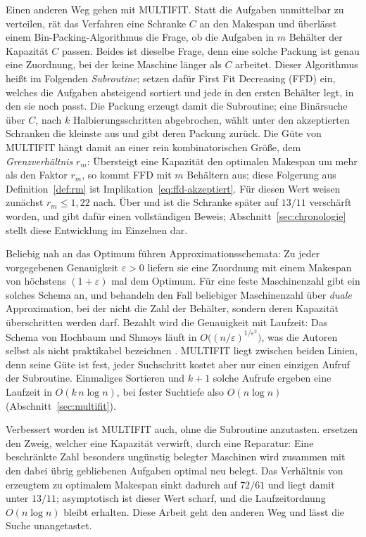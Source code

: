 Einen anderen Weg gehen \textcite{coffman1978} mit MULTIFIT.
Statt die Aufgaben unmittelbar zu verteilen, rät das Verfahren eine Schranke $C$ an den Makespan
und überlässt einem Bin-Packing-Algorithmus die Frage, ob die Aufgaben in $m$ Behälter der
Kapazität $C$ passen.
Beides ist dieselbe Frage, denn eine solche Packung ist genau eine Zuordnung, bei der keine
Maschine länger als $C$ arbeitet.
Dieser Algorithmus heißt im Folgenden \emph{Subroutine}; \textcite{coffman1978} setzen dafür
First Fit Decreasing (FFD) ein, welches die Aufgaben absteigend sortiert und jede in den ersten
Behälter legt, in den sie noch passt.
Die Packung erzeugt damit die Subroutine; eine Binärsuche über $C$, nach $k$
Halbierungsschritten abgebrochen, wählt unter den akzeptierten Schranken die kleinste aus und
gibt deren Packung zurück.
Die Güte von MULTIFIT hängt damit an einer rein kombinatorischen Größe, dem
\emph{Grenzverhältnis} $r_m$: Übersteigt eine Kapazität den optimalen Makespan um mehr als den
Faktor $r_m$, so kommt FFD mit $m$ Behältern aus; diese Folgerung aus
Definition~\ref{def:rm} ist Implikation~\eqref{eq:ffd-akzeptiert}.
Für diesen Wert weisen \textcite{coffman1978} zunächst $r_m \le 1{,}22$ nach.
Über \textcite{friesen1984} und \textcite{yue1990} ist die Schranke später auf $13/11$ verschärft
worden, und \textcite{cao1995} gibt dafür einen vollständigen Beweis;
Abschnitt~\ref{sec:chronologie} stellt diese Entwicklung im Einzelnen dar.

Beliebig nah an das Optimum führen Approximationsschemata: Zu jeder vorgegebenen Genauigkeit
$\varepsilon > 0$ liefern sie eine Zuordnung mit einem Makespan von höchstens $(1+\varepsilon)$
mal dem Optimum.
Für eine feste Maschinenzahl gibt \textcite{sahni1976} ein solches Schema an, und
\textcite{hochbaum_shmoys_1987} behandeln den Fall beliebiger Maschinenzahl über \emph{duale}
Approximation, bei der nicht die Zahl der Behälter, sondern deren Kapazität überschritten werden
darf.
Bezahlt wird die Genauigkeit mit Laufzeit: Das Schema von Hochbaum und Shmoys läuft in
$O\bigl((n/\varepsilon)^{1/\varepsilon^{2}}\bigr)$, was die Autoren selbst als nicht praktikabel
bezeichnen \cite[S.~146]{hochbaum_shmoys_1987}.
MULTIFIT liegt zwischen beiden Linien, denn seine Güte ist fest, jeder Suchschritt kostet aber
nur einen einzigen Aufruf der Subroutine.
Einmaliges Sortieren und $k+1$ solche Aufrufe ergeben eine Laufzeit in $O(k\,n \log n)$, bei
fester Suchtiefe also $O(n \log n)$ (Abschnitt~\ref{sec:multifit}).

Verbessert worden ist MULTIFIT auch, ohne die Subroutine anzutasten.
\textcite{friesen_langston1986} ersetzen den Zweig, welcher eine Kapazität verwirft, durch eine
Reparatur: Eine beschränkte Zahl besonders ungünstig belegter Maschinen wird zusammen mit den
dabei übrig gebliebenen Aufgaben optimal neu belegt.
Das Verhältnis von erzeugtem zu optimalem Makespan sinkt dadurch auf $72/61$ und liegt damit
unter $13/11$; asymptotisch ist dieser Wert scharf, und die Laufzeitordnung $O(n \log n)$
bleibt erhalten.
Diese Arbeit geht den anderen Weg und lässt die Suche unangetastet.

